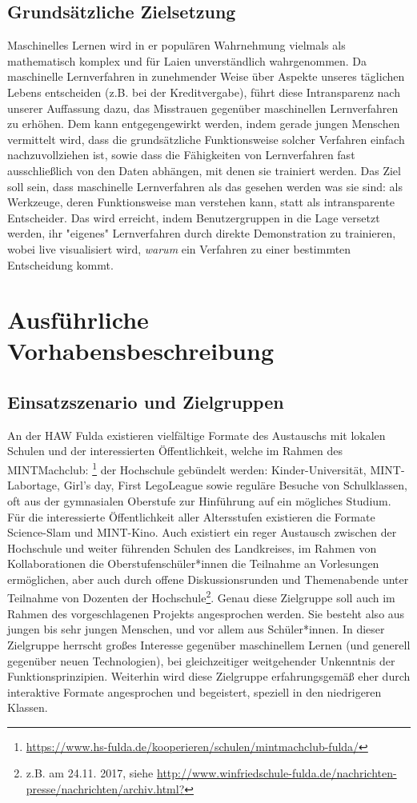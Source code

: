 \documentclass[11pt]{article}
\begin{document}
\subsection{Grundsätzliche Zielsetzung}
%
Maschinelles Lernen wird in er populären Wahrnehmung vielmals als mathematisch komplex und für Laien unverständlich wahrgenommen. Da maschinelle Lernverfahren in zunehmender Weise über Aspekte unseres täglichen Lebens entscheiden (z.B. bei der Kreditvergabe), führt diese Intransparenz nach unserer Auffassung dazu, das Misstrauen gegenüber maschinellen Lernverfahren zu erhöhen. Dem kann entgegengewirkt werden, indem gerade jungen Menschen vermittelt wird, dass
die grundsätzliche Funktionsweise solcher Verfahren einfach nachzuvollziehen ist, sowie dass die Fähigkeiten von Lernverfahren fast ausschließlich von den Daten abhängen, mit denen sie trainiert werden. Das Ziel soll sein, dass maschinelle Lernverfahren als das gesehen werden was sie sind: als Werkzeuge, deren Funktionsweise man verstehen kann, statt als intransparente Entscheider.
Das wird erreicht, indem Benutzergruppen in die Lage versetzt werden, ihr "eigenes" Lernverfahren durch direkte Demonstration zu trainieren, wobei live visualisiert wird, {\it warum} ein Verfahren zu einer bestimmten Entscheidung kommt.
%
\renewcommand{\thesection}{2}
\section{Ausführliche Vorhabensbeschreibung}\label{sec:besch}
\subsection{Einsatzszenario und Zielgruppen}\label{sec:zg}
%
An der HAW Fulda existieren vielfältige Formate des Austauschs mit lokalen Schulen und der interessierten Öffentlichkeit, welche im Rahmen des MINTMachclub: \footnote{\url {https://www.hs-fulda.de/kooperieren/schulen/mintmachclub-fulda/}} der Hochschule gebündelt werden: Kinder-Universität, MINT-Labortage, Girl's day, First LegoLeague sowie reguläre Besuche von Schulklassen, oft aus der gymnasialen Oberstufe zur Hinführung auf ein mögliches Studium. Für die interessierte Öffentlichkeit aller Altersstufen existieren die Formate Science-Slam und MINT-Kino. Auch existiert ein reger Austausch zwischen der Hochschule und weiter führenden Schulen des Landkreises, im Rahmen von Kollaborationen die Oberstufenschüler*innen die Teilnahme an Vorlesungen ermöglichen, aber auch durch offene Diskussionsrunden und Themenabende unter Teilnahme von Dozenten der Hochschule\footnote{z.B. am 24.11. 2017, siehe \url{http://www.winfriedschule-fulda.de/nachrichten-presse/nachrichten/archiv.html?}}. Genau diese Zielgruppe soll auch im Rahmen des vorgeschlagenen Projekts angesprochen werden. Sie besteht also aus jungen bis sehr jungen Menschen, und vor allem aus Schüler*innen. In dieser Zielgruppe herrscht großes Interesse gegenüber maschinellem Lernen (und generell gegenüber neuen Technologien), bei gleichzeitiger weitgehender Unkenntnis der Funktionsprinzipien.
Weiterhin wird diese Zielgruppe erfahrungsgemäß eher durch interaktive Formate angesprochen und begeistert, speziell in den niedrigeren Klassen.
\end{document}

